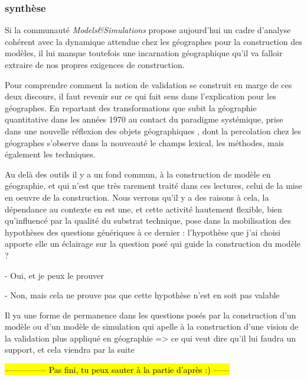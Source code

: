 








\subsubsection{synthèse}

Si la communauté \textit{Models\&Simulations} propose aujourd'hui un cadre d'analyse cohérent avec la dynamique attendue chez les géographes pour la construction des modèles, il lui manque toutefois une incarnation géographique qu'il va falloir extraire de nos propres exigences de construction.

Pour comprendre comment la notion de validation se construit en marge de ces deux discours, il faut revenir sur ce qui fait sens dans l'explication pour les géographes. En repartant des transformations que subit la géographie quantitative dans les années 1970 au contact du paradigme systémique, prise dans une nouvelle réflexion des objets géographiques , dont la percolation chez les géographes s'observe dans la nouveauté le champs lexical, les méthodes, mais également les techniques.

Au delà des outils il y a un fond commun, à la construction de modèle en géographie, et qui n'est que très rarement traité dans ces lectures, celui de la mise en oeuvre de la construction. Nous verrons qu'il y a des raisons à cela, la dépendance au contexte en est une, et cette activité hautement flexible, bien qu'influencé par la qualité du substrat technique, pose dans la mobilisation des hypothèses des questions génériques à ce dernier : l'hypothèse que j'ai choisi apporte elle un éclairage sur la question posé qui guide la construction du modèle ?

- Oui, et je peux le prouver 

- Non, mais cela ne prouve pas que cette hypothèse n'est en soit pas valable 

Il ya une forme de permanence dans les questions posés par la construction d'un modèle ou d'un modèle de simulation qui apelle à la construction d'une vision de la validation plus appliqué en géographie => ce qui veut dire qu'il lui faudra un support, et cela viendra par la suite

\hl{--------------- Pas fini, tu peux sauter à la partie d'après :) ------}

